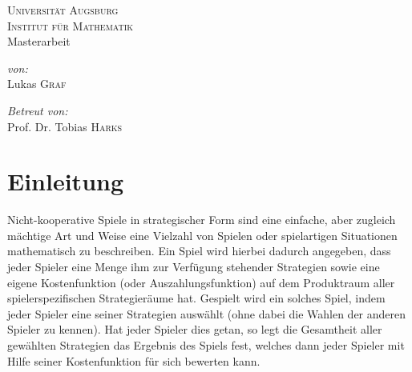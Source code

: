 \documentclass[a4paper,ngerman,11pt,bibliography=totoc]{scrartcl}
\theoremstyle{definition}
\theoremstyle{plain}
\theoremstyle{remark}
\begin{document}
	
	
	

\author{Lukas Graf}
\date{Letzte Aktualisierung: \today}

\thispagestyle{empty}


\begin{titlepage}\center
	\textsc{\LARGE Universität Augsburg}\\[1cm]
	
	\textsc{\Large Institut für Mathematik}\\[1.5cm]
	
	{\Large Masterarbeit \\[1cm]}
	{\huge {}}

	\vfill
	
	\begin{minipage}{0.4\textwidth}
		\begin{flushleft} \large
			\emph{von:}\\
			Lukas \textsc{Graf}
		\end{flushleft}
	\end{minipage}
	\begin{minipage}{0.4\textwidth}
		\begin{flushright} \large
			\emph{Betreut von:} \\
			Prof. Dr. Tobias \textsc{Harks}
		\end{flushright}
	\end{minipage}
	
\end{titlepage}


\tableofcontents

{}
\section*{Einleitung}

Nicht-kooperative Spiele in strategischer Form sind eine einfache, aber zugleich mächtige Art und Weise eine Vielzahl von Spielen oder spielartigen Situationen mathematisch zu beschreiben. Ein Spiel wird hierbei dadurch angegeben, dass jeder Spieler eine Menge ihm zur Verfügung stehender Strategien sowie eine eigene Kostenfunktion (oder Auszahlungsfunktion) auf dem Produktraum aller spielerspezifischen Strategieräume hat. \glqq Gespielt\grqq{} wird ein solches Spiel, indem jeder Spieler eine seiner Strategien auswählt (ohne dabei die Wahlen der anderen Spieler zu kennen). Hat jeder Spieler dies getan, so legt die Gesamtheit aller gewählten Strategien das Ergebnis des Spiels fest, welches dann jeder Spieler mit Hilfe seiner Kostenfunktion für sich bewerten kann.
\end{document}
